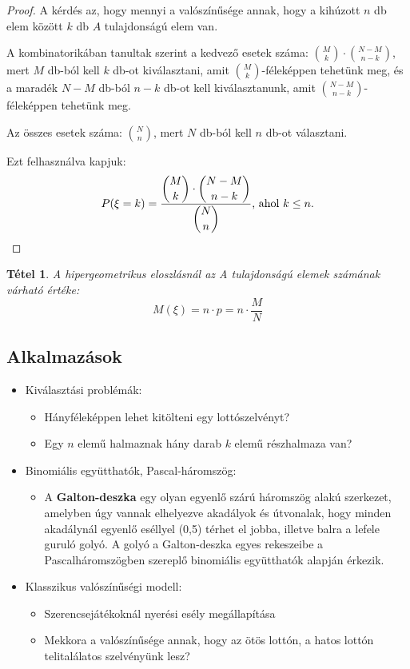 \documentclass[12pt,a4paper]{article}
\newtheorem{theorem}{Tétel} [section]
\begin{document}
\begin{proof}

A kérdés az, hogy mennyi a valószínűsége annak, hogy a kihúzott $n$ db elem között $k$ db $A$ tulajdonságú elem van.

A kombinatorikában tanultak szerint a kedvező esetek száma: $\displaystyle\binom{M}{k}\cdot \displaystyle\binom{N-M}{n-k}$, mert $M$ db-ból kell $k$ db-ot kiválasztani, amit $\displaystyle\binom{M}{k}$-féleképpen tehetünk meg, és a maradék $N - M$ db-ból $n - k$ db-ot kell kiválasztanunk, amit $\displaystyle\binom{N-M}{n-k}$-féleképpen tehetünk meg.

Az összes esetek száma: $\displaystyle\binom{N}{n}$, mert $N$ db-ból kell $n$ db-ot választani.

Ezt felhasználva kapjuk:
\[P(\xi =k)=\dfrac{\displaystyle\binom{M}{k}\cdot \displaystyle\binom{N-M}{n-k}}{\displaystyle\binom{N}{n}} \text{\normalfont , ahol } k\leq n.\]

\end{proof}

\begin{theorem}
A hipergeometrikus eloszlásnál az A tulajdonságú elemek számának várható értéke:
\[M(\xi)=n\cdot p=n\cdot\dfrac{M}{N}\]
\end{theorem}
\newpage
\subsection{Alkalmazások}
\begin{itemize}
\item Kiválasztási problémák:
\begin{itemize}
\item Hányféleképpen lehet kitölteni egy lottószelvényt?
\item Egy $n$ elemű halmaznak hány darab $k$ elemű részhalmaza van?
\end{itemize}
\item Binomiális együtthatók, Pascal-háromszög:
\begin{itemize}
\item A \textbf{Galton-deszka} egy olyan egyenlő szárú háromszög alakú szerkezet, amelyben úgy vannak elhelyezve akadályok és útvonalak, hogy minden akadálynál egyenlő eséllyel (0,5) térhet el jobba, illetve balra a lefele guruló golyó. A golyó a Galton-deszka egyes rekeszeibe a Pascalháromszögben szereplő binomiális együtthatók alapján érkezik.
\end{itemize}
\item Klasszikus valószínűségi modell:
\begin{itemize}
\item Szerencsejátékoknál nyerési esély megállapítása
\item Mekkora a valószínűsége annak, hogy az ötös lottón, a hatos lottón telitalálatos szelvényünk lesz?
\end{itemize}
\end{itemize}
\end{document}
